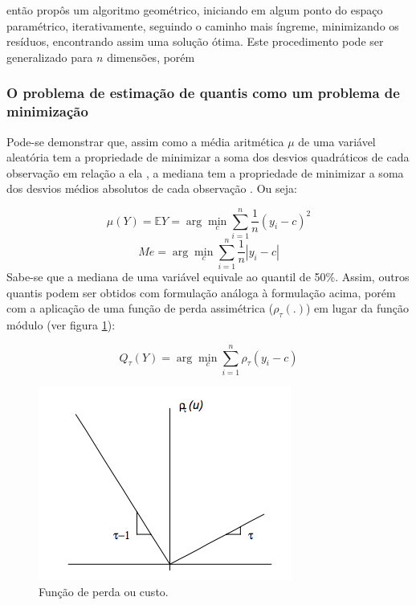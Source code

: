 \documentclass[a4paper, 12pt]{article}
\begin{document}
\textcite{edgeworth1888} então propôs um algoritmo geométrico, iniciando
em algum ponto do espaço paramétrico, iterativamente, seguindo o caminho
mais íngreme, minimizando os resíduos, encontrando assim uma solução
ótima. Este procedimento pode ser generalizado para \(n\) dimensões,
porém

\hypertarget{o-problema-de-estimacao-de-quantis-como-um-problema-de-minimizacao}{%
\subsubsection{O problema de estimação de quantis como um problema de
minimização}\label{o-problema-de-estimacao-de-quantis-como-um-problema-de-minimizacao}}

Pode-se demonstrar que, assim como a média aritmética \(\mu\) de uma
variável aleatória tem a propriedade de minimizar a soma dos desvios
quadráticos de cada observação em relação a ela
\autocite[50]{matloff2017}, a mediana tem a propriedade de minimizar a
soma dos desvios médios absolutos de cada observação \autocite[
260]{matloff2017}. Ou seja:

\[\mu(Y) = \mathbb{E}Y = \arg \min_c \sum_{i = 1}^n \frac{1}{n}(y_i - c)^2\]
\[Me = \arg \min_c \sum_{i = 1}^n \frac{1}{n}|y_i - c|\] Sabe-se que a
mediana de uma variável equivale ao quantil de 50\%. Assim, outros
quantis podem ser obtidos com formulação análoga à formulação acima,
porém com a aplicação de uma função de perda assimétrica
(\(\rho_\tau(.)\)) em lugar da função módulo (ver figura
\ref{fig:custo}):

\[Q_\tau(Y) = \arg \min_c \sum_{i = 1}^n \rho_\tau(y_i - c)\]

\begin{figure}[H]

{\centering \includegraphics[width=0.7\linewidth]{DmKq7} 

}

\caption{Função de perda ou custo.}\label{fig:custo}
\end{figure}
\end{document}

